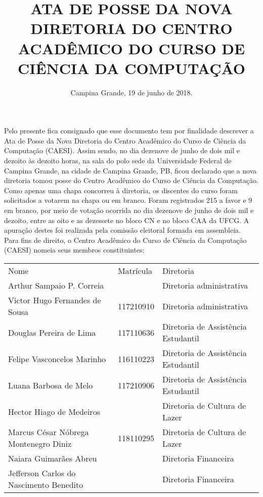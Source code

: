 \documentclass[11pt,letterpaper]{article}
\begin{document}
\title{ ATA DE POSSE DA NOVA DIRETORIA DO CENTRO ACADÊMICO DO CURSO DE CIÊNCIA DA COMPUTAÇÃO }
\date{Campina Grande, 19 de junho de 2018.}
\maketitle

Pelo presente fica consignado que esse documento tem por finalidade descrever a Ata de Posse da Nova Diretoria do Centro Acadêmico do Curso de Ciência da Computação (CAESI). Assim sendo, no dia dezenove de junho de dois mil e dezoito às dezoito horas, na sala do polo sede da Universidade Federal de Campina Grande, na cidade de Campina Grande, PB, ficou declarado que a nova diretoria tomou posse do Centro Acadêmico do Curso de Ciência da Computação. \\

Como apenas uma chapa concorreu à diretoria, os discentes do curso foram solicitados a votarem na chapa ou em branco. Foram registrados 215 a favor e 9 em branco, por meio de votação ocorrida no dia dezenove de junho de dois mil e dezoito, entre as oito e as dezessete no bloco CN e no bloco CAA da UFCG. A apuração destes foi realizada pela comissão eleitoral formada em assembleia. \\

Para fins de direito, o Centro Acadêmico do Curso de Ciência da Computação (CAESI) nomeia seus membros constituintes:\\

\begin{center}
\begin{tabular}{|l|l|l|}
\hline
Nome & Matrícula & Diretoria \\
Arthur Sampaio P. Correia & & Diretoria administrativa \\
Victor Hugo Fernandes de Sousa & 117210910 & Diretoria administrativa \\
Douglas Pereira de Lima & 117110636 & Diretoria de Assistência Estudantil \\
Felipe Vasconcelos Marinho & 116110223 & Diretoria de Assistência Estudantil \\
Luana Barbosa de Melo & 117210906 & Diretoria de Assistência Estudantil \\
Hector Hiago de Medeiros & & Diretoria de Cultura de Lazer \\
Marcus César Nóbrega Montenegro Diniz & 118110295 & Diretoria de Cultura de Lazer \\
Naiara Guimarães Abreu & &  Diretoria Financeira \\
Jefferson Carlos do Nascimento Benedito & & Diretoria Financeira \\
\hline
\end{tabular}\\
\end{center}
\end{document}
